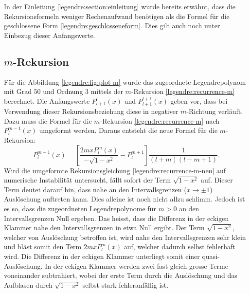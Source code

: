 In der Einleitung \ref{legendre:section:einleitung} wurde bereits erwähnt, dass die Rekursionsformeln weniger Rechenaufwand benötigen als die Formel für die geschlossene Form \eqref{legendre:geschlosseneform}.
Dies gilt auch noch unter Einbezug dieser Anfangswerte.

\subsection{$m$-Rekursion
\label{legendre:subsection:mrichtung}}
Für die Abbildung \ref{legendre:fig:plot-m} wurde das zugeordnete Legendrepolynom mit Grad 50 und Ordnung 3 mittels der $m$-Rekursion \eqref{legendre:recurrence-m} berechnet.
Die Anfangswerte $P^{l}_{l+1}(x)$ und $P^{l+1}_{l+1}(x)$ geben vor, dass bei Verwendung dieser Rekursionsbeziehung diese in negativer $m$-Richtung verläuft.
Dazu muss die Formel für die $m$-Rekursion \eqref{legendre:recurrence-m} nach $P^{m-1}_{l}(x)$ umgeformt werden.
Daraus entsteht die neue Formel für die $m$-Rekursion:  
\begin{equation}
P^{m-1}_{l}(x)
= \left[ \frac{2mxP^{m}_{l}(x)}{- \sqrt{1-x^2}}-P^{m+1}_{l} \right]
\frac{1}{(l+m)(l-m+1)} .
\label{legendre:recurrence-m-neu}
\end{equation}
Wird die umgeformte Rekursionsgleichung \eqref{legendre:recurrence-m-neu} auf numerische Instabilität untersucht, fällt sofort der Term $\sqrt{1-x^2}$ auf.
Dieser Term deutet darauf hin, dass nahe an den Intervallsgrenzen ($x \rightarrow \pm 1$) Auslöschung auftreten kann.
%
Dies alleine ist noch nicht allzu schlimm.
Jedoch ist es so, dass die zugeordneten Legendrepolynome für $m>0$ an den Intervallsgrenzen Null ergeben.
Das heisst, dass die Differenz in der eckigen Klammer nahe den Intervallsgrenzen in etwa Null ergibt.
Der Term $\sqrt{1-x^2}$, welcher von Auslöschung betroffen ist, wird nahe den Intervallsgrenzen sehr klein und bläst somit den Term $2mxP^{m}_{l}(x)$ auf, welcher dadurch selbst fehlerhaft wird.
Die Differenz in der eckigen Klammer unterliegt somit einer quasi-Auslöschung.
In der eckigen Klammer werden zwei fast gleich grosse Terme voneinander subtrahiert, wobei der erste Term durch die Auslöschung und das Aufblasen durch $\sqrt{1-x^2}$ selbst stark fehleranfällig ist.

